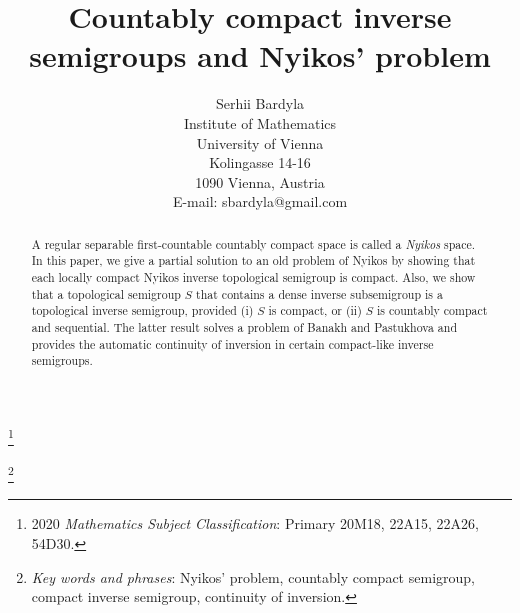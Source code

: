 \documentclass[12pt, twoside, leqno]{article}
\theoremstyle{definition}
\numberwithin{equation}{section}
\begin{document}

\baselineskip=17pt



\title{Countably compact inverse semigroups and Nyikos' problem}

\author{Serhii Bardyla\\
Institute of Mathematics\\ 
University of Vienna\\
Kolingasse 14-16\\
1090 Vienna, Austria\\
E-mail: sbardyla@gmail.com
}

\date{}

\maketitle


\renewcommand{\thefootnote}{}

\footnote{2020 \emph{Mathematics Subject Classification}: Primary 20M18, 22A15, 22A26, 54D30.}

\footnote{\emph{Key words and phrases}: Nyikos' problem, countably compact semigroup, compact inverse semigroup, continuity of inversion.}

\renewcommand{\thefootnote}{\arabic{footnote}}
\setcounter{footnote}{0}


\begin{abstract}
A regular separable first-countable countably compact space is called a {\em Nyikos} space.
In this paper, we give a partial solution to an old problem of Nyikos by showing that each locally compact Nyikos inverse topological semigroup is compact. Also, we show that a topological semigroup $S$ that contains a dense inverse subsemigroup is a topological inverse semigroup, provided (i) $S$ is compact, or (ii) $S$ is countably compact and sequential. The latter result solves a problem of Banakh and Pastukhova and provides the automatic continuity of inversion in certain compact-like inverse semigroups.
\end{abstract}
\end{document}
